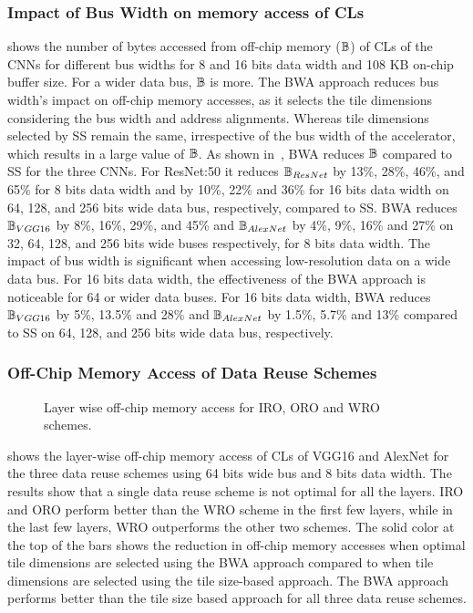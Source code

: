 \subsubsection{Impact of Bus Width on memory access of CLs}
 shows the number of bytes accessed from off-chip memory ($\mathbb{B}$) of CLs of the CNNs for different bus widths for 8 and 16 bits data width and 108 KB on-chip buffer size. For a wider data bus, $\mathbb{B}$ is more. The BWA approach reduces bus width's impact on off-chip memory accesses, as it selects the tile dimensions considering the bus width and address alignments. Whereas tile dimensions selected by SS remain the same, irrespective of the bus width of the accelerator, which results in a large value of $\mathbb{B}$.
As shown in~, BWA reduces $\mathbb{B}$ compared to SS for the three CNNs. For ResNet:50 it reduces $\mathbb{B}_{ResNet}$ by 13\%, 28\%, 46\%, and 65\% for 8 bits data width and by 10\%, 22\% and 36\% for 16 bits data width on 64, 128, and 256 bits wide data bus, respectively, compared to SS. 
BWA reduces $\mathbb{B}_{VGG16}$ by 8\%, 16\%, 29\%, and 45\% and $\mathbb{B}_{AlexNet}$ by 4\%, 9\%, 16\% and 27\% on 32, 64, 128, and 256 bits wide buses respectively, for 8 bits data width. 
The impact of bus width is significant when accessing low-resolution data on a wide data bus. For 16 bits data width, the effectiveness of the BWA approach is noticeable for 64 or wider data buses. For 16 bits data width, BWA reduces $\mathbb{B}_{VGG16}$ by 5\%, 13.5\% and 28\% and $\mathbb{B}_{AlexNet}$ by 1.5\%, 5.7\% and 13\% compared to SS on 64, 128, and 256 bits wide data bus, respectively.
\subsubsection{Off-Chip Memory Access of Data Reuse  Schemes}\label{sec:ResultsDataReuseScheme}
\begin{figure}[htb]
	\centering
	\hfil
	\hfil	
	\caption{Layer wise off-chip memory access for IRO, ORO and WRO schemes.}
	\label{fig:DataReuseSchemeCompare}
	\vspace{-1.0em}	
\end{figure}
 shows the layer-wise off-chip memory access of CLs of VGG16 and AlexNet for the three data reuse schemes using 64 bits wide bus and 8 bits data width. The results show that a single data reuse scheme is not optimal for all the layers. IRO and ORO perform better than the WRO scheme in the first few layers, while in the last few layers, WRO outperforms the other two schemes. The solid color at the top of the bars shows the reduction in off-chip memory accesses when optimal tile dimensions are selected using the BWA approach compared to when tile dimensions are selected using the tile size-based approach. The BWA approach performs better than the tile size based approach for all three data reuse schemes.
